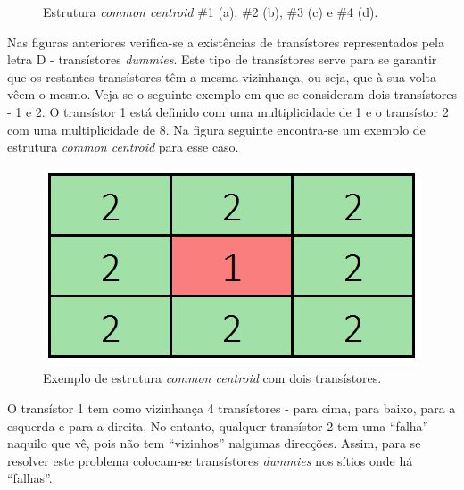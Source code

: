 \documentclass[11pt]{article}
\numberwithin{equation}{section}
\begin{document}
\begin{figure}[H]
	\vspace{-0.8em}
	\caption{Estrutura \textit{common centroid} \#1 (a), \#2 (b), \#3 (c) e \#4 (d).}
	\vspace{-0.8em}
	\label{fig:common centroid}
\end{figure}

Nas figuras anteriores verifica-se a existências de transístores representados pela letra D - transístores \textit{dummies}. Este tipo de transístores serve para se garantir que os restantes transístores têm a mesma vizinhança, ou seja, que à sua volta vêem o mesmo. Veja-se o seguinte exemplo em que se consideram dois transístores - 1 e 2. O transístor 1 está definido com uma multiplicidade de 1 e o transístor 2 com uma multiplicidade de 8. Na figura seguinte encontra-se um exemplo de estrutura \textit{common centroid} para esse caso. 

\begin{figure}[H]
	\centering
	\includegraphics[keepaspectratio=true, scale=0.35]{teoricas/dummy1}
	\vspace{-0.5em}
	\caption{Exemplo de estrutura \textit{common centroid} com dois transístores.}
	\vspace{-0.8em}
\end{figure} 

O transístor 1 tem como vizinhança 4 transístores - para cima, para baixo, para a esquerda e para a direita. No entanto, qualquer transístor 2 tem uma ``falha'' naquilo que vê, pois não tem ``vizinhos'' nalgumas direcções. Assim, para se resolver este problema colocam-se transístores \textit{dummies} nos sítios onde há ``falhas''.
\end{document}
